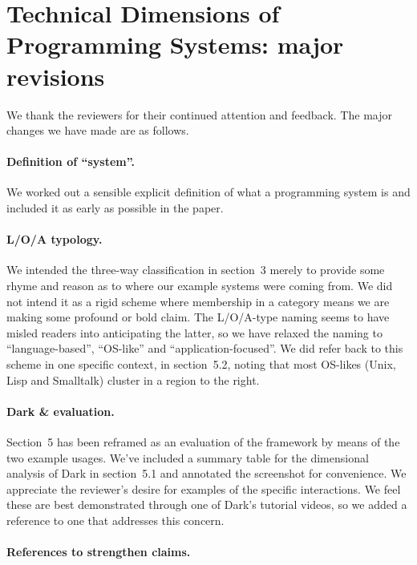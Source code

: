 \section*{Technical Dimensions of Programming Systems: major revisions}

We thank the reviewers for their continued attention and feedback. The
major changes we have made are as follows.

\paragraph{Definition of ``system''.}

We worked out a sensible explicit definition of what a programming
system is and included it as early as possible in the paper.

\paragraph{L/O/A typology.}

We intended the three-way classification in section~3 merely to provide
some rhyme and reason as to where our example systems were coming from.
We did not intend it as a rigid scheme where membership in a category
means we are making some profound or bold claim. The L/O/A-type naming
seems to have misled readers into anticipating the latter, so we have
relaxed the naming to ``language-based'', ``OS-like'' and
``application-focused''. We did refer back to this scheme in one
specific context, in section~5.2, noting that most OS-likes (Unix, Lisp
and Smalltalk) cluster in a region to the right.

\paragraph{Dark \& evaluation.}

Section~5 has been reframed as an evaluation of the framework by means
of the two example usages. We've included a summary table for the
dimensional analysis of Dark in section~5.1 and annotated the screenshot
for convenience. We appreciate the reviewer's desire for examples of the
specific interactions. We feel these are best demonstrated through one
of Dark's tutorial videos, so we added a reference to one that addresses
this concern.

\paragraph{References to strengthen claims.}

